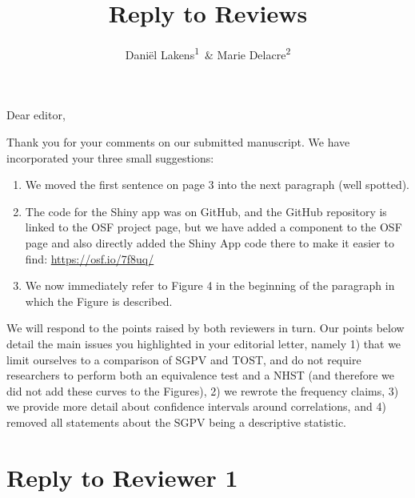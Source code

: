 \documentclass[man]{apa6}
\title{Reply to Reviews}
\author{Daniël Lakens\textsuperscript{1}~\& Marie Delacre\textsuperscript{2}}
\date{}
\affiliation{
\vspace{0.5cm}
\textsuperscript{1} Eindhoven University of Technology, Eindhoven, The Netherlands\\\textsuperscript{2} Service of Analysis of the Data, Université Libre de Bruxelles, Belgium}
\providecommand{\tightlist}{%
  \setlength{\itemsep}{0pt}\setlength{\parskip}{0pt}}
\begin{document}
\maketitle

Dear editor,

Thank you for your comments on our submitted manuscript. We have incorporated your three small suggestions:

\begin{enumerate}
\def\labelenumi{\arabic{enumi}.}
\tightlist
\item
  We moved the first sentence on page 3 into the next paragraph (well spotted).
\item
  The code for the Shiny app was on GitHub, and the GitHub repository is linked to the OSF project page, but we have added a component to the OSF page and also directly added the Shiny App code there to make it easier to find: \url{https://osf.io/7f8uq/}
\item
  We now immediately refer to Figure 4 in the beginning of the paragraph in which the Figure is described.
\end{enumerate}

We will respond to the points raised by both reviewers in turn. Our points below detail the main issues you highlighted in your editorial letter, namely 1) that we limit ourselves to a comparison of SGPV and TOST, and do not require researchers to perform both an equivalence test and a NHST (and therefore we did not add these curves to the Figures), 2) we rewrote the frequency claims, 3) we provide more detail about confidence intervals around correlations, and 4) removed all statements about the SGPV being a descriptive statistic.

\hypertarget{reply-to-reviewer-1}{%
\section{Reply to Reviewer 1}\label{reply-to-reviewer-1}}
\end{document}
